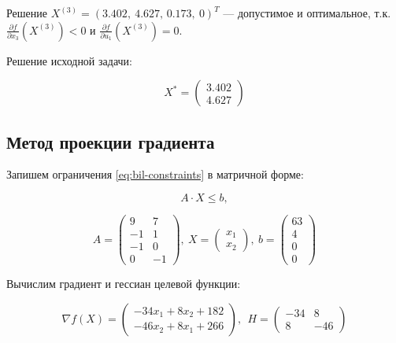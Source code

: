 Решение $X^{(3)} = (3.402,\ 4.627,\, 0.173,\ 0)^T$ --- допустимое и оптимальное, т.к. $\frac{\partial f}{\partial x_3} (X^{(3)}) < 0$ и  $\frac{\partial f}{\partial u_1} (X^{(3)}) = 0$.

Решение исходной задачи:

\begin{equation*}
	X^{*} = \begin{pmatrix}
		3.402 \\ 4.627
	\end{pmatrix}
\end{equation*}

\subsection{Метод проекции градиента}

Запишем ограничения \ref{eq:bil-constraints} в матричной форме:

\begin{equation*}
	A \cdot X \leq b, 
\end{equation*}

\begin{equation*}
	A = \begin{pmatrix}
		9 & 7
		\\
		-1 & 1
		\\
		-1 & 0
		\\
		0 & -1
	\end{pmatrix}
	,\ %
	X = \begin{pmatrix}
	x_1 \\ x_2
	\end{pmatrix}
	,\ %
	b = \begin{pmatrix}
		63 \\ 4 \\ 0 \\ 0
	\end{pmatrix}
\end{equation*}

Вычислим градиент и гессиан целевой функции:

\begin{equation*}
	\nabla f(X) = \begin{pmatrix}
		-34 x_1 + 8 x_2 + 182
		\\
		-46 x_2 + 8 x_1 + 266
	\end{pmatrix}%
	,\ \ %
	H = \begin{pmatrix}
		-34 & 8
		\\
		8 & -46	
	\end{pmatrix}
\end{equation*}

